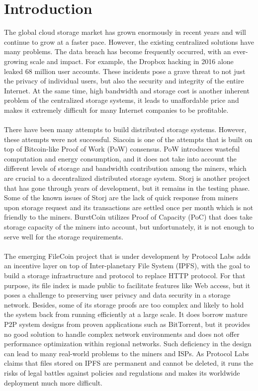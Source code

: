 \documentclass[10pt,a4paper]{article}
\begin{document}
\section{Introduction} %
\vspace{-0.5em}
The global cloud storage market has grown enormously in recent years and will continue to grow at a faster pace. However, the existing centralized solutions have many problems. The data breach has become frequently occurred, with an ever-growing scale and impact. For example, the Dropbox hacking in 2016 alone leaked 68 million user accounts. These incidents pose a grave threat to not just the privacy of individual users, but also the security and integrity of the entire Internet. At the same time, high bandwidth and storage cost is another inherent problem of the centralized storage systems, it leads to unaffordable price and makes it extremely difficult for many Internet companies to be profitable.
\vspace{-0.5em}
\\ \\There have been many attempts to build distributed storage systems. However, these attempts were not successful. Siacoin is one of the attempts that is built on top of Bitcoin-like Proof of Work (PoW) consensus. PoW introduces wasteful computation and energy consumption, and it does not take into account the different levels of storage and bandwidth contribution among the miners, which are crucial to a decentralized distributed storage system. Storj is another project that has gone through years of development, but it remains in the testing phase. Some of the known issues of Storj are the lack of quick response from miners upon storage request and its transactions are settled once per month which is not friendly to the miners. BurstCoin utilizes Proof of Capacity (PoC) that does take storage capacity of the miners into account, but unfortunately, it is not enough to serve well for the storage requirements.
\vspace{-0.5em}
\\ \\The emerging FileCoin project that is under development by Protocol Labs adds an incentive layer on top of Inter-planetary File System (IPFS), with the goal to build a storage infrastructure and protocol to replace HTTP protocol. For that purpose, its file index is made public to facilitate features like Web access, but it poses a challenge to preserving user privacy and data security in a storage network. Besides, some of its storage proofs are too complex and likely to hold the system back from running efficiently at a large scale. It does borrow mature P2P system designs from proven applications such as BitTorrent, but it provides no good solution to handle complex network environments and does not offer performance optimization within regional networks. Such deficiency in the design can lead to many real-world problems to the miners and ISPs. As Protocol Labs claims that files stored on IPFS are permanent and cannot be deleted, it runs the risks of legal battles against policies and regulations and makes its worldwide deployment much more difficult.
\end{document}
